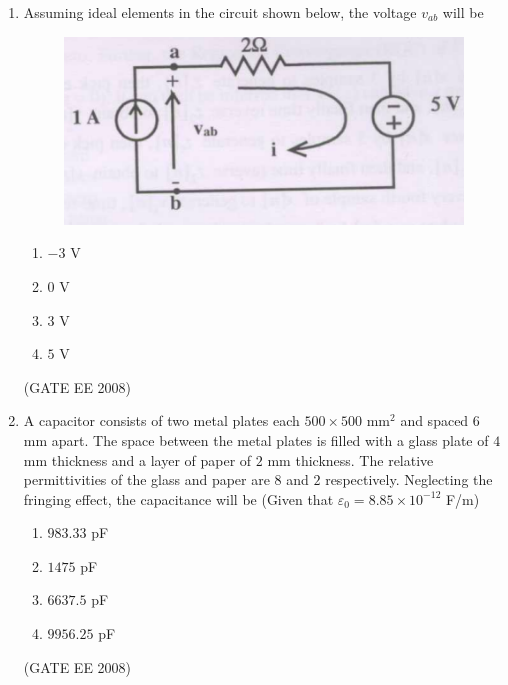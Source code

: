 \documentclass[journal,12pt,onecolumn]{IEEEtran}
\theoremstyle{remark}
\begin{document}
\begin{enumerate}[start=1, label=Q.\arabic*]
\item Assuming ideal elements in the circuit shown below, the voltage $v_{ab}$ will be

\begin{figure}[H]
    \centering
    \includegraphics[width=\columnwidth]{Fig/q23.png}
    \caption{}
\end{figure}

\begin{multicols}{4}
\begin{enumerate}
    \item $-3$ V
    \item $0$ V
    \item $3$ V
    \item $5$ V
\end{enumerate}
\end{multicols}
\hfill (GATE EE 2008)




\item A capacitor consists of two metal plates each $500 \times 500$ mm$^{2}$ and spaced $6$ mm apart. The space between the metal plates is filled with a glass plate of $4$ mm thickness and a layer of paper of $2$ mm thickness. The relative permittivities of the glass and paper are $8$ and $2$ respectively. Neglecting the fringing effect, the capacitance will be (Given that $\varepsilon_0 = 8.85 \times 10^{-12}$ F/m)

\begin{multicols}{4}
\begin{enumerate}
    \item $983.33$ pF
    \item $1475$ pF
    \item $6637.5$ pF
    \item $9956.25$ pF
\end{enumerate}
\end{multicols}
\hfill (GATE EE 2008)


\end{enumerate}
\end{document}
